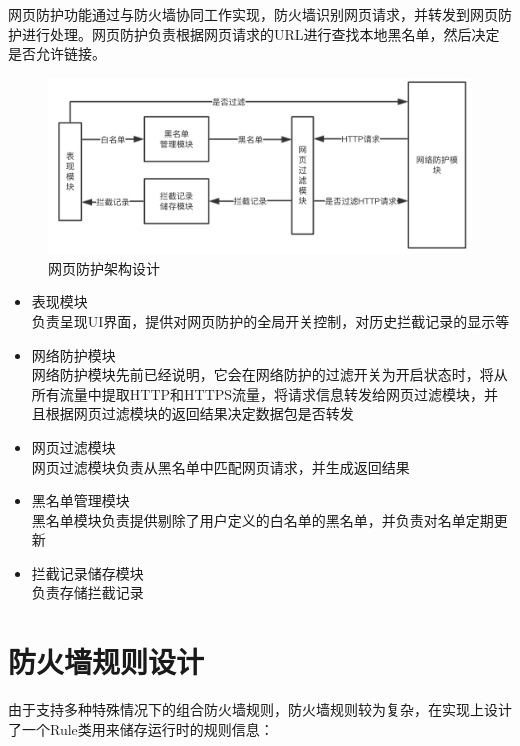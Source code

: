 \documentclass[format=final, language=chinese, degree=fyp]{hustthesis}
\begin{document}
网页防护功能通过与防火墙协同工作实现，防火墙识别网页请求，并转发到网页防护进行处理。网页防护负责根据网页请求的URL进行查找本地黑名单，然后决定是否允许链接。

\begin{figure}[!h]
\centering
\includegraphics[width=1\textwidth]{function_3_ori.png}
\caption{网页防护架构设计}\label{fig:4-3}
\end{figure}

\begin{itemize}
    \item 表现模块\\ 负责呈现UI界面，提供对网页防护的全局开关控制，对历史拦截记录的显示等
    \item 网络防护模块\\ 网络防护模块先前已经说明，它会在网络防护的过滤开关为开启状态时，将从所有流量中提取HTTP和HTTPS流量，将请求信息转发给网页过滤模块，并且根据网页过滤模块的返回结果决定数据包是否转发
    \item 网页过滤模块\\ 网页过滤模块负责从黑名单中匹配网页请求，并生成返回结果
    \item 黑名单管理模块\\ 黑名单模块负责提供剔除了用户定义的白名单的黑名单，并负责对名单定期更新
    \item 拦截记录储存模块\\ 负责存储拦截记录
\end{itemize}

\section{防火墙规则设计}

由于支持多种特殊情况下的组合防火墙规则，防火墙规则较为复杂，在实现上设计了一个Rule类用来储存运行时的规则信息：
\end{document}
